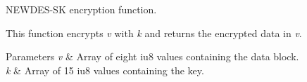 N\-E\-W\-D\-E\-S-\/\-S\-K encryption function. 

This function encrypts {\itshape v} with {\itshape k} and returns the encrypted data in {\itshape v}.


\begin{DoxyParams}{Parameters}
{\em v} & Array of eight iu8 values containing the data block. \\
\hline
{\em k} & Array of 15 iu8 values containing the key. \\
\hline
\end{DoxyParams}
